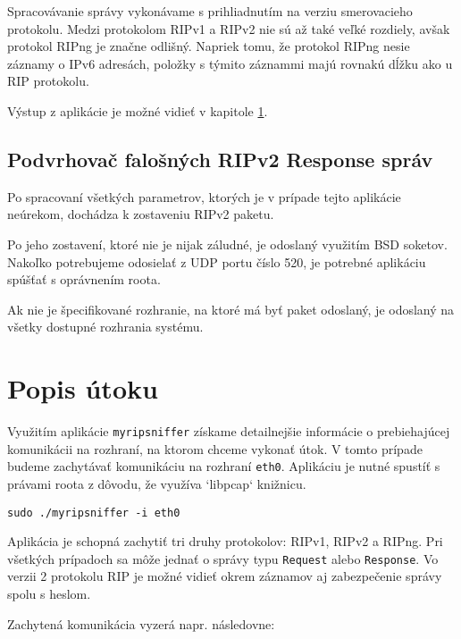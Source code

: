 \documentclass[12pt,a4paper,titlepage,final]{article}
\begin{document}
Spracovávanie správy vykonávame s prihliadnutím na verziu smerovacieho protokolu. Medzi protokolom RIPv1 a RIPv2 nie sú až také veľké rozdiely, avšak protokol RIPng je značne odlišný. Napriek tomu, že protokol RIPng nesie záznamy o IPv6 adresách, položky s týmito záznammi majú rovnakú dĺžku ako u RIP protokolu.

Výstup z aplikácie je možné vidieť v kapitole \ref{utok}.

\subsection{Podvrhovač falošných RIPv2 Response správ}

Po spracovaní všetkých parametrov, ktorých je v prípade tejto aplikácie neúrekom, dochádza k zostaveniu RIPv2 paketu.

Po jeho zostavení, ktoré nie je nijak záludné, je odoslaný využitím BSD soketov. Nakoľko potrebujeme odosielať z UDP portu číslo 520, je potrebné aplikáciu spúšťať s oprávnením roota. 

Ak nie je špecifikované rozhranie, na ktoré má byť paket odoslaný, je odoslaný na všetky dostupné rozhrania systému.

\newpage

\section{Popis útoku} \label{utok}

Využitím aplikácie \texttt{myripsniffer} získame detailnejšie informácie o prebiehajúcej komunikácii na rozhraní, na ktorom chceme vykonať útok. V tomto prípade budeme zachytávať komunikáciu na rozhraní \texttt{eth0}. Aplikáciu je nutné spustíť s právami roota z dôvodu, že využíva `libpcap` knižnicu.

\begin{verbatim}
sudo ./myripsniffer -i eth0
\end{verbatim}

Aplikácia je schopná zachytiť tri druhy protokolov: RIPv1, RIPv2 a RIPng. Pri všetkých prípadoch sa môže jednať o správy typu \texttt{Request} alebo \texttt{Response}. Vo verzii 2 protokolu RIP je možné vidieť okrem záznamov aj zabezpečenie správy spolu s heslom.

Zachytená komunikácia vyzerá napr. následovne: 
\end{document}
